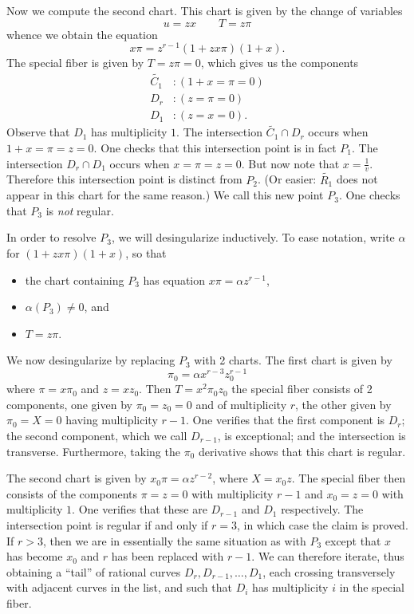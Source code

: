 \documentclass{article}
\theoremstyle{plain}
\theoremstyle{definition}
\theoremstyle{remark}
\renewcommand{\tilde}[1]{\widetilde{#1}}
\begin{document}
Now we compute the second chart. This chart is given by the change of variables
\[
u=zx \qquad T=z\pi
\]
whence we obtain the equation
\[
x\pi = z^{r-1}(1 + zx\pi)(1 + x).
\]
The special fiber is given by $T = z\pi = 0$, which gives us the components
\begin{align*}
  \tilde{C_1}&: (1 + x = \pi = 0) \\
  D_r&: (z = \pi = 0) \\
  D_1&: (z = x = 0).
\end{align*}
Observe that $D_1$ has multiplicity $1$. The intersection $\tilde{C_1} \cap D_r$ occurs when $1 + x = \pi = z = 0$. One checks that this intersection point is in fact $P_1$. The intersection $D_r \cap D_1$ occurs when $x = \pi = z = 0$. But now note that $x = \frac{1}{v}$. Therefore this intersection point is distinct from $P_2$. (Or easier: $\tilde{R_1}$ does not appear in this chart for the same reason.) We call this new point $P_3$. One checks that $P_3$ is \emph{not} regular.

In order to resolve $P_3$, we will desingularize inductively. To ease notation, write $\alpha$ for $(1 + zx\pi)(1 + x)$, so that
\begin{itemize}
    \item the chart containing $P_3$ has equation $x\pi = \alpha z^{r-1}$,
    \item $\alpha(P_3) \neq 0$, and
    \item $T = z\pi$.
\end{itemize}

We now desingularize by replacing $P_3$ with 2 charts. The first chart is given by
\[
\pi_0 = \alpha x^{r-3} z_0^{r-1}
\]
where $\pi = x \pi_0$ and $z = x z_0$. Then $T = x^2 \pi_0 z_0$ the special fiber consists of 2 components, one given by $\pi_0 = z_0 = 0$ and of multiplicity $r$, the other given by $\pi_0 = X = 0$ having multiplicity $r-1$. One verifies that the first component is $D_r$; the second component, which we call $D_{r-1}$, is exceptional; and the intersection is transverse. Furthermore, taking the $\pi_0$ derivative shows that this chart is regular.

  The second chart is given by $x_0 \pi = \alpha z^{r-2}$, where $X = x_0 z$. The special fiber then consists of the components $\pi = z = 0$ with multiplicity $r-1$ and $x_0 = z = 0$ with multiplicity $1$. One verifies that these are $D_{r-1}$ and $D_1$ respectively. The intersection point is regular if and only if $r = 3$, in which case the claim is proved. If $r > 3$, then we are in essentially the same situation as with $P_3$ except that $x$ has become $x_0$ and $r$ has been replaced with $r-1$. We can therefore iterate, thus obtaining a ``tail'' of rational curves $D_r, D_{r-1}, \dots, D_1$, each crossing transversely with adjacent curves in the list, and such that $D_i$ has multiplicity $i$ in the special fiber.
\end{document}
